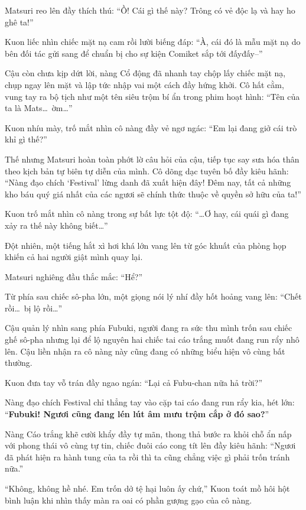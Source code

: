 \documentclass[../main.tex]{subfiles}
\begin{document}

Matsuri reo lên đầy thích thú:
``Ồ! Cái gì thế này? Trông có vẻ độc lạ và hay ho ghê ta!''

Kuon liếc nhìn chiếc mặt nạ cam rồi lười biếng đáp:
``À, cái đó là mẫu mặt nạ do bên đối tác gửi sang để chuẩn bị cho sự kiện Comiket sắp tới đấyđấy--''

Cậu còn chưa kịp dứt lời, nàng Cổ động đã nhanh tay chộp lấy chiếc mặt nạ, chụp ngay lên mặt và lập tức nhập vai một cách đầy hứng khởi. Cô hất cằm, vung tay ra bộ tịch như một tên siêu trộm bí ẩn trong phim hoạt hình:
``Tên của ta là Mats\dots\ ờm\dots''

Kuon nhíu mày, trố mắt nhìn cô nàng đầy vẻ ngơ ngác:
``Em lại đang giở cái trò khỉ gì thế?''

Thế nhưng Matsuri hoàn toàn phớt lờ câu hỏi của cậu, tiếp tục say sưa hóa thân theo kịch bản tự biên tự diễn của mình. Cô dõng dạc tuyên bố đầy kiêu hãnh:
``Nàng đạo chích `Festival' lừng danh đã xuất hiện đây! Đêm nay, tất cả những kho báu quý giá nhất của các ngươi sẽ chính thức thuộc về quyền sở hữu của ta!''

Kuon trố mắt nhìn cô nàng trong sự bất lực tột độ:
``\dots Ơ hay, cái quái gì đang xảy ra thế này không biết\dots''

Đột nhiên, một tiếng hắt xì hơi khá lớn vang lên từ góc khuất của phòng họp khiến cả hai người giật mình quay lại.

Matsuri nghiêng đầu thắc mắc:
``Hể?''

Từ phía sau chiếc sô-pha lớn, một giọng nói lý nhí đầy hốt hoảng vang lên:
``Chết rồi\dots\ bị lộ rồi\dots''

Cậu quản lý nhìn sang phía Fubuki, người đang ra sức thu mình trốn sau chiếc ghế sô-pha nhưng lại để lộ nguyên hai chiếc tai cáo trắng muốt đang run rẩy nhô lên. Cậu liền nhận ra cô nàng này cũng đang có những biểu hiện vô cùng bất thường.

Kuon đưa tay vỗ trán đầy ngao ngán:
``Lại cả Fubu-chan nữa hả trời?''

Nàng đạo chích Festival chỉ thẳng tay vào cặp tai cáo đang run rẩy kia, hét lớn: ``\textbf{Fubuki! Ngươi cũng đang lén lút âm mưu trộm cắp ở đó sao?}''

Nàng Cáo trắng khẽ cười khẩy đầy tự mãn, thong thả bước ra khỏi chỗ ẩn nấp với phong thái vô cùng tự tin, chiếc đuôi cáo cong tít lên đầy kiêu hãnh:
``Ngươi đã phát hiện ra hành tung của ta rồi thì ta cũng chẳng việc gì phải trốn tránh nữa.''

``Không, không hề nhé. Em trốn dở tệ hại luôn ấy chứ,'' Kuon toát mồ hôi hột bình luận khi nhìn thấy màn ra oai có phần gượng gạo của cô nàng.
\end{document}
